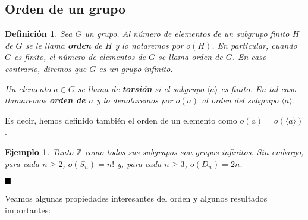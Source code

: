 \documentclass[12pt]{article}
\newtheorem{definition}[theorem]{Definición}
\newtheorem{example}{Ejemplo}[theorem]
\begin{document}
\subsection{Orden de un grupo}

\begin{definition}Sea $G$ un grupo. Al número de elementos de un subgrupo finito $H$ de $G$ se le llama \textbf{orden} de $H$ y lo notaremos por $o(H)$. En particular, cuando $G$ es finito, el número de elementos de $G$ se llama orden de $G$. En caso contrario, diremos que $G$ es un grupo infinito.

Un elemento $a \in G$ se llama de \textbf{torsión} si el subgrupo $\langle a \rangle$ es finito. En tal caso llamaremos \textbf{orden de $a$} y lo denotaremos por $o(a)$ al orden del subgrupo $\langle a \rangle$.
\end{definition}

Es decir, hemos definido también el orden de un elemento como $o(a) = o(\langle a \rangle)$.

\begin{example}Tanto $\mathbb{Z}$ como todos sus subgrupos son grupos infinitos. Sin embargo, para cada $n \geq 2$, $o(S_n) = n!$ y, para cada $n \geq 3$, $o(D_n) = 2n$.
\end{example}

$\hfill \blacksquare$

Veamos algunas propiedades interesantes del orden y algunos resultados importantes: 
\end{document}
